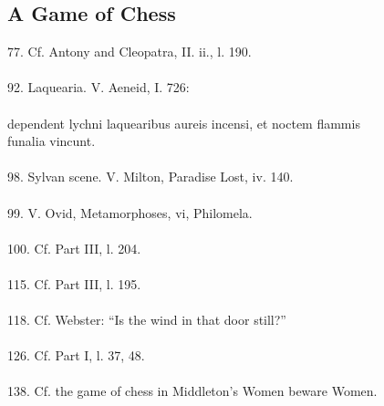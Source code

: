 \documentclass{article}
\begin{document}
\subsection{A Game of Chess}
77.  Cf.  Antony and Cleopatra, II. ii., l. 190. \\
 \\
92.  Laquearia.  V.  Aeneid, I. 726: \\
 \\
\indent     dependent lychni laquearibus aureis incensi, et noctem flammis \\
\hspace*{1.2in}                   funalia vincunt. \\
 \\
98.  Sylvan scene.  V. Milton, Paradise Lost, iv.  140. \\
 \\
99.  V. Ovid, Metamorphoses, vi, Philomela. \\
 \\
100.  Cf.  Part III, l. 204. \\
 \\
115.  Cf.  Part III, l. 195. \\
 \\
118.  Cf.  Webster:  ``Is the wind in that door still?'' \\
 \\
126.  Cf.  Part I, l. 37, 48. \\
 \\
138.  Cf.  the game of chess in Middleton's Women beware Women. \\
 \\
\end{document}

